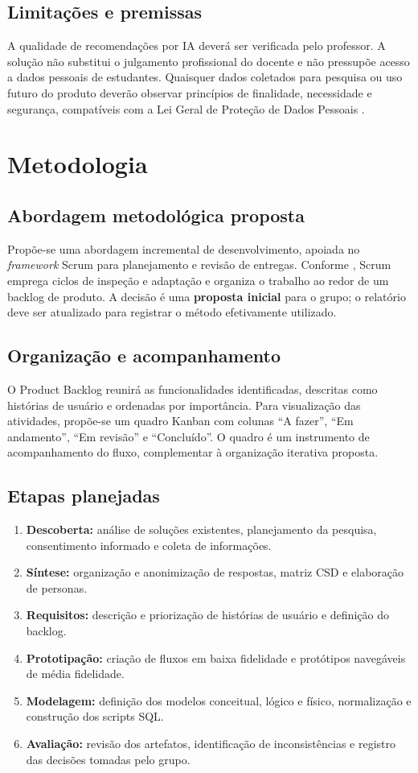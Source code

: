 \documentclass[12pt,a4paper,oneside]{report}
\begin{document}
\section{Limitações e premissas}
A qualidade de recomendações por IA deverá ser verificada pelo professor. A solução não substitui o julgamento profissional do docente e não pressupõe acesso a dados pessoais de estudantes. Quaisquer dados coletados para pesquisa ou uso futuro do produto deverão observar princípios de finalidade, necessidade e segurança, compatíveis com a Lei Geral de Proteção de Dados Pessoais \citep{brasil2018}.

\chapter{Metodologia}
\section{Abordagem metodológica proposta}
Propõe-se uma abordagem incremental de desenvolvimento, apoiada no \textit{framework} Scrum para planejamento e revisão de entregas. Conforme \citet{schwaber2020}, Scrum emprega ciclos de inspeção e adaptação e organiza o trabalho ao redor de um backlog de produto. A decisão é uma \textbf{proposta inicial} para o grupo; o relatório deve ser atualizado para registrar o método efetivamente utilizado.

\section{Organização e acompanhamento}
O Product Backlog reunirá as funcionalidades identificadas, descritas como histórias de usuário e ordenadas por importância. Para visualização das atividades, propõe-se um quadro Kanban com colunas ``A fazer'', ``Em andamento'', ``Em revisão'' e ``Concluído''. O quadro é um instrumento de acompanhamento do fluxo, complementar à organização iterativa proposta.

\section{Etapas planejadas}
\begin{enumerate}
  \item \textbf{Descoberta:} análise de soluções existentes, planejamento da pesquisa, consentimento informado e coleta de informações.
  \item \textbf{Síntese:} organização e anonimização de respostas, matriz CSD e elaboração de personas.
  \item \textbf{Requisitos:} descrição e priorização de histórias de usuário e definição do backlog.
  \item \textbf{Prototipação:} criação de fluxos em baixa fidelidade e protótipos navegáveis de média fidelidade.
  \item \textbf{Modelagem:} definição dos modelos conceitual, lógico e físico, normalização e construção dos scripts SQL.
  \item \textbf{Avaliação:} revisão dos artefatos, identificação de inconsistências e registro das decisões tomadas pelo grupo.
\end{enumerate}
\end{document}
